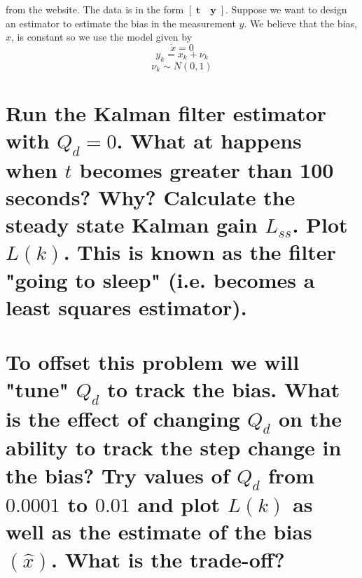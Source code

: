 \documentclass[12pt,letterpaper, onecolumn]{exam}
\begin{document}
\begin{questions}
    \clearpage
     from the website. The data is in the form $\left[\;\mathbf{t} \quad \mathbf{y}\;\right]$. Suppose we want to design an estimator to estimate the bias in the measurement $y$. We believe that the bias,$x$, is constant so we use the model given by
    \[\dot{x} = 0\]
    \[y_k = x_k + \nu_k \]
    \[\nu_k \sim N(0,1) \]
    \begin{parts}
        \part{Run the Kalman filter estimator with $Q_d = 0$. What at happens when $t$ becomes greater than 100 seconds? Why? Calculate the steady state Kalman gain $L_{ss}$. Plot $L(k)$. This is known as the filter "going to sleep" (i.e. becomes a least squares estimator). }

        \part{To offset this problem we will "tune" $Q_d$ to track the bias. What is the effect of changing $Q_d$ on the ability to track the step change in the bias? Try values of $Q_d$ from $0.0001$ to $0.01$ and plot $L(k)$ as well as the estimate of the bias $(\hat{x})$. What is the trade-off?}


\end{parts}
\end{questions}
\end{document}

